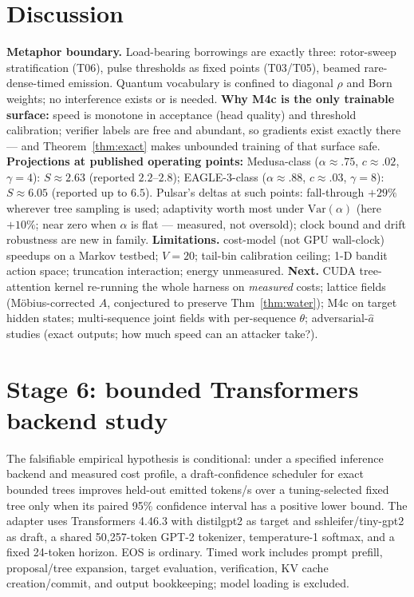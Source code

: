 \documentclass[11pt,a4paper]{article}
\theoremstyle{definition}
\begin{document}
\section{Discussion}
\textbf{Metaphor boundary.} Load-bearing borrowings are exactly three:
rotor-sweep stratification (T06), pulse thresholds as fixed points
(T03/T05), beamed rare-dense-timed emission. Quantum vocabulary is confined
to diagonal $\rho$ and Born weights; no interference exists or is needed.
\textbf{Why M4c is the only trainable surface:} speed is monotone in
acceptance (head quality) and threshold calibration; verifier labels are
free and abundant, so gradients exist exactly there --- and
Theorem~\ref{thm:exact} makes unbounded training of that surface safe.
\textbf{Projections at published operating points:} Medusa-class
($\alpha\!\approx\!.75$, $c\!\approx\!.02$, $\gamma{=}4$):
$S\approx2.63$ (reported $2.2$--$2.8$); EAGLE-3-class
($\alpha\!\approx\!.88$, $c\!\approx\!.03$, $\gamma{=}8$): $S\approx6.05$
(reported up to $6.5$). Pulsar's deltas at such points: fall-through
$+29\%$ wherever tree sampling is used; adaptivity worth most under
$\mathrm{Var}(\alpha)$ (here $+10\%$; near zero when $\alpha$ is flat ---
measured, not oversold); clock bound and drift robustness are new in family.
\textbf{Limitations.} cost-model (not GPU wall-clock) speedups on a Markov
testbed; $V=20$; tail-bin calibration ceiling; 1-D bandit action space;
truncation interaction; energy unmeasured.
\textbf{Next.} CUDA tree-attention kernel re-running the whole harness on
\emph{measured} costs; lattice fields (Möbius-corrected $A$, conjectured to
preserve Thm~\ref{thm:water}); M4c on target hidden states; multi-sequence
joint fields with per-sequence $\theta$; adversarial-$\hat a$ studies (exact
outputs; how much speed can an attacker take?).

\section{Stage 6: bounded Transformers backend study}
The falsifiable empirical hypothesis is conditional: under a specified
inference backend and measured cost profile, a draft-confidence scheduler for
exact bounded trees improves held-out emitted tokens/s over a tuning-selected
fixed tree only when its paired 95\% confidence interval has a positive lower
bound. The adapter uses Transformers 4.46.3 with distilgpt2 as target and
sshleifer/tiny-gpt2 as draft, a shared 50,257-token GPT-2 tokenizer,
temperature-1 softmax, and a fixed 24-token horizon. EOS is ordinary. Timed
work includes prompt prefill, proposal/tree expansion, target evaluation,
verification, KV cache creation/commit, and output bookkeeping; model loading
is excluded.
\end{document}
